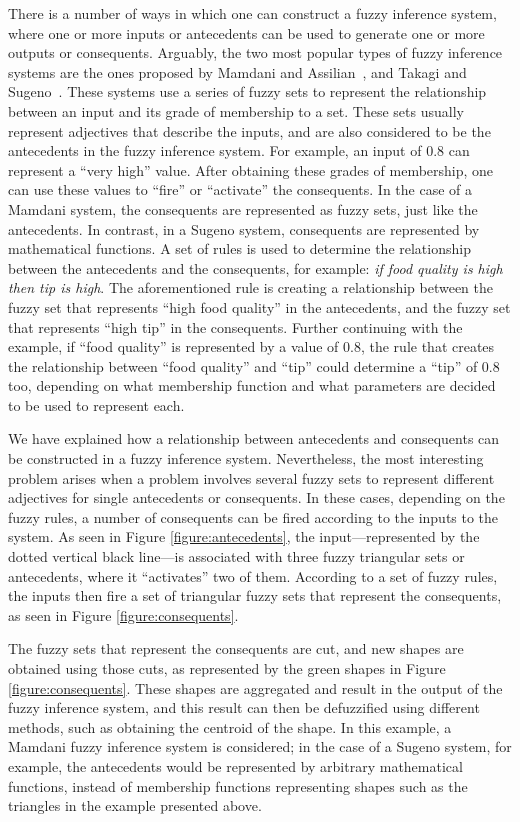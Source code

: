 ﻿\documentclass{ieeeaccess}
\begin{document}
There is a number of ways in which one can construct a fuzzy inference system,
where one or more inputs or antecedents can be used to generate one or more
outputs or consequents. Arguably, the two most popular types of fuzzy inference
systems are the ones proposed by Mamdani and Assilian~\cite{Mamdani1975}, and
Takagi and Sugeno~\cite{Takagi1985}. These systems use a series of fuzzy sets to
represent the relationship between an input and its grade of membership to a
set. These sets usually represent adjectives that describe the inputs, and are
also considered to be the antecedents in the fuzzy inference system. For
example, an input of 0.8 can represent a ``very high'' value. After obtaining
these grades of membership, one can use these values to ``fire'' or ``activate''
the consequents. In the case of a Mamdani system, the consequents are
represented as fuzzy sets, just like the antecedents. In contrast, in a Sugeno
system, consequents are represented by mathematical functions. A set of rules is
used to determine the relationship between the antecedents and the consequents,
for example: \textit{if food quality is high then tip is high}. The
aforementioned rule is creating a relationship between the fuzzy set that
represents ``high food quality'' in the antecedents, and the fuzzy set that
represents ``high tip'' in the consequents. Further continuing with the example,
if ``food quality'' is represented by a value of 0.8, the rule that creates the
relationship between ``food quality'' and ``tip'' could determine a ``tip'' of
0.8 too, depending on what membership function and what parameters are decided
to be used to represent each.

We have explained how a relationship between antecedents and consequents can
be constructed in a fuzzy inference system. Nevertheless, the most interesting
problem arises when a problem involves several fuzzy sets to represent different
adjectives for single antecedents or consequents. In these cases, depending on
the fuzzy rules, a number of consequents can be fired according to the inputs to
the system. As seen in Figure \ref{figure:antecedents}, the input---represented
by the dotted vertical black line---is associated with three fuzzy
triangular sets or antecedents, where it ``activates'' two of them. According to
a set of fuzzy rules, the inputs then fire a set of triangular fuzzy sets that
represent the consequents, as seen in Figure \ref{figure:consequents}.

The fuzzy sets that represent the consequents are cut, and new shapes are
obtained using those cuts, as represented by the green shapes in Figure
\ref{figure:consequents}. These shapes are aggregated and result in the output
of the fuzzy inference system, and this result can then be defuzzified using
different methods, such as obtaining the centroid of the shape. In this example,
a Mamdani fuzzy inference system is considered; in the case of a Sugeno system,
for example, the antecedents would be represented by arbitrary mathematical
functions, instead of membership functions representing shapes such as the
triangles in the example presented above.
\end{document}
